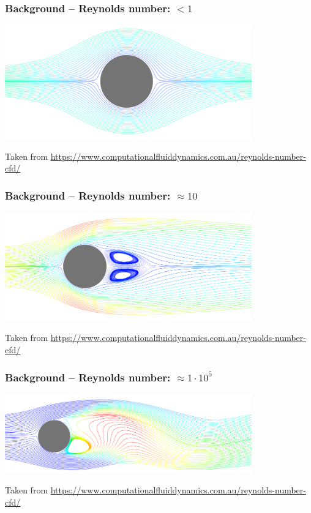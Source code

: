 \begin{frame}
    \frametitle{Background -- Reynolds number: $<1$}
	\vspace*{8mm}
\includegraphics[width=0.8\textwidth, height=.55\textheight]{./Ressourcen/Praesentation/Bilder/Re/re_1.png}

Taken from \url{https://www.computationalfluiddynamics.com.au/reynolds-number-cfd/}
\end{frame}
\clearpage

\begin{frame}
    \frametitle{Background -- Reynolds number: $\approx 10$}
	\vspace*{8mm}
\includegraphics[width=0.8\textwidth, height=.55\textheight]{./Ressourcen/Praesentation/Bilder/Re/re_10.png}

Taken from \url{https://www.computationalfluiddynamics.com.au/reynolds-number-cfd/}
\end{frame}
\clearpage

\begin{frame}
    \frametitle{Background -- Reynolds number: $\approx 1 \cdot 10^5$}
	\vspace*{8mm}
\includegraphics[width=0.8\textwidth, height=.55\textheight]{./Ressourcen/Praesentation/Bilder/Re/re_1e5.png}

Taken from \url{https://www.computationalfluiddynamics.com.au/reynolds-number-cfd/}
\end{frame}
\clearpage

